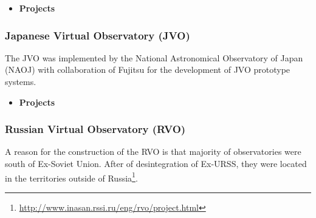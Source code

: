 \documentclass[11pt]{article}
\begin{document}
                \begin{itemize}
                    \item \textbf{Projects}
                \end{itemize}

            \subsubsection{Japanese Virtual Observatory (JVO)}
                The JVO was implemented by the National Astronomical Observatory
of Japan (NAOJ) with collaboration of Fujitsu for the development of JVO
prototype systems.

                \begin{itemize}
                    \item \textbf{Projects}
                \end{itemize}

            \subsubsection{Russian Virtual Observatory (RVO)}
                A reason for the construction of the RVO is that majority of
observatories were south of Ex-Soviet Union. After of desintegration of Ex-URSS,
they were located in the territories outside of
Russia\footnote{\url{http://www.inasan.rssi.ru/eng/rvo/project.html}}.
                
\end{document}
